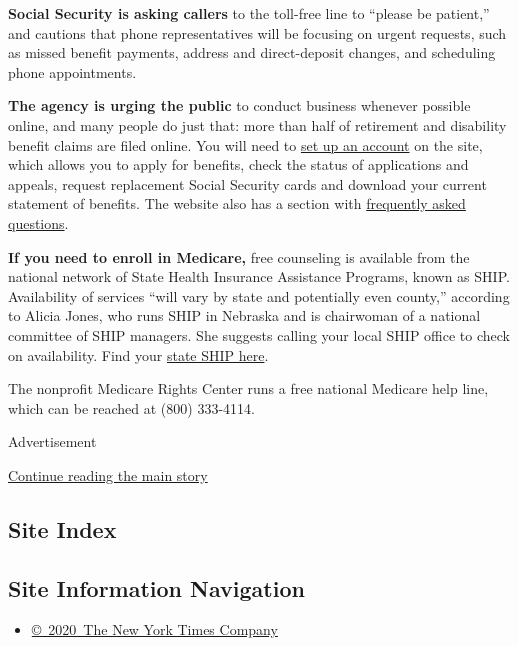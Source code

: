 \textbf{Social Security is asking callers} to the toll-free line to
``please be patient,'' and cautions that phone representatives will be
focusing on urgent requests, such as missed benefit payments, address
and direct-deposit changes, and scheduling phone appointments.

\textbf{The agency is urging the public} to conduct business whenever
possible online, and many people do just that: more than half of
retirement and disability benefit claims are filed online. You will need
to \href{https://www.ssa.gov/onlineservices/}{set up an account} on the
site, which allows you to apply for benefits, check the status of
applications and appeals, request replacement Social Security cards and
download your current statement of benefits. The website also has a
section with \href{https://faq.ssa.gov/en-US/}{frequently asked
questions}.

\textbf{If you need to enroll in Medicare,} free counseling is available
from the national network of State Health Insurance Assistance Programs,
known as SHIP. Availability of services ``will vary by state and
potentially even county,'' according to Alicia Jones, who runs SHIP in
Nebraska and is chairwoman of a national committee of SHIP managers. She
suggests calling your local SHIP office to check on availability. Find
your \href{https://www.shiptacenter.org/}{state SHIP here}.

The nonprofit Medicare Rights Center runs a free national Medicare help
line, which can be reached at (800) 333-4114.

Advertisement

\protect\hyperlink{after-bottom}{Continue reading the main story}

\hypertarget{site-index}{%
\subsection{Site Index}\label{site-index}}

\hypertarget{site-information-navigation}{%
\subsection{Site Information
Navigation}\label{site-information-navigation}}

\begin{itemize}
\tightlist
\item
  \href{https://help.nytimes3xbfgragh.onion/hc/en-us/articles/115014792127-Copyright-notice}{©~2020~The
  New York Times Company}
\end{itemize}

